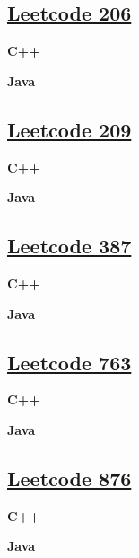 \subsection{\href{https://leetcode-cn.com/}{Leetcode 206}}\label{app:codelist:leetcode:206}

\textbf{C++}\par


\textbf{Java}\par



\subsection{\href{https://leetcode-cn.com/}{Leetcode 209}}\label{app:codelist:leetcode:209}

\textbf{C++}\par


\textbf{Java}\par



\subsection{\href{https://leetcode-cn.com/}{Leetcode 387}}\label{app:codelist:leetcode:387}

\textbf{C++}\par


\textbf{Java}\par



\subsection{\href{https://leetcode-cn.com/}{Leetcode 763}}\label{app:codelist:leetcode:763}

\textbf{C++}\par


\textbf{Java}\par



\subsection{\href{https://leetcode-cn.com/}{Leetcode 876}}\label{app:codelist:leetcode:876}

\textbf{C++}\par


\textbf{Java}\par



